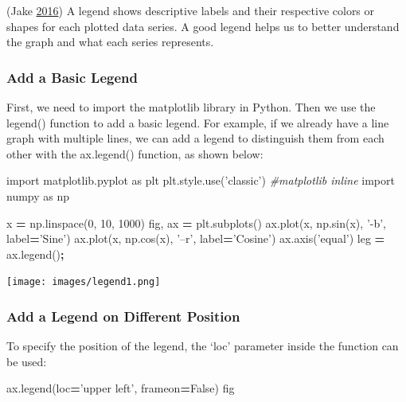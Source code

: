 \documentclass[]{book}
\newenvironment{Shaded}{\begin{snugshade}}{\end{snugshade}}
\newcommand{\CommentTok}[1]{\textcolor[rgb]{0.56,0.35,0.01}{\textit{#1}}}
\newcommand{\DecValTok}[1]{\textcolor[rgb]{0.00,0.00,0.81}{#1}}
\newcommand{\ImportTok}[1]{#1}
\newcommand{\NormalTok}[1]{#1}
\newcommand{\OperatorTok}[1]{\textcolor[rgb]{0.81,0.36,0.00}{\textbf{#1}}}
\newcommand{\StringTok}[1]{\textcolor[rgb]{0.31,0.60,0.02}{#1}}
\newcommand{\VariableTok}[1]{\textcolor[rgb]{0.00,0.00,0.00}{#1}}
\begin{document}
(Jake \protect\hyperlink{ref-PythonDataScienceHandbook}{2016})
A legend shows descriptive labels and their respective colors or shapes for each plotted data series. A good legend helps us to better understand the graph and what each series represents.

\hypertarget{add-a-basic-legend}{%
\subsubsection{Add a Basic Legend}\label{add-a-basic-legend}}

First, we need to import the matplotlib library in Python. Then we use the legend() function to add a basic legend. For example, if we already have a line graph with multiple lines, we can add a legend to distinguish them from each other with the ax.legend() function, as shown below:

\begin{Shaded}
\begin{Highlighting}[]
\ImportTok{import}\NormalTok{ matplotlib.pyplot }\ImportTok{as}\NormalTok{ plt}
\NormalTok{plt.style.use(}\StringTok{'classic'}\NormalTok{)}
\CommentTok{#matplotlib inline}
\ImportTok{import}\NormalTok{ numpy }\ImportTok{as}\NormalTok{ np}

\NormalTok{x }\OperatorTok{=}\NormalTok{ np.linspace(}\DecValTok{0}\NormalTok{, }\DecValTok{10}\NormalTok{, }\DecValTok{1000}\NormalTok{)}
\NormalTok{fig, ax }\OperatorTok{=}\NormalTok{ plt.subplots()}
\NormalTok{ax.plot(x, np.sin(x), }\StringTok{'-b'}\NormalTok{, label}\OperatorTok{=}\StringTok{'Sine'}\NormalTok{)}
\NormalTok{ax.plot(x, np.cos(x), }\StringTok{'--r'}\NormalTok{, label}\OperatorTok{=}\StringTok{'Cosine'}\NormalTok{)}
\NormalTok{ax.axis(}\StringTok{'equal'}\NormalTok{)}
\NormalTok{leg }\OperatorTok{=}\NormalTok{ ax.legend()}\OperatorTok{;}
\end{Highlighting}
\end{Shaded}

\texttt{[image: images/legend1.png]}

\hypertarget{add-a-legend-on-different-position}{%
\subsubsection{Add a Legend on Different Position}\label{add-a-legend-on-different-position}}

To specify the position of the legend, the `loc' parameter inside the function can be used:

\begin{Shaded}
\begin{Highlighting}[]
\NormalTok{ax.legend(loc}\OperatorTok{=}\StringTok{'upper left'}\NormalTok{, frameon}\OperatorTok{=}\VariableTok{False}\NormalTok{)}
\NormalTok{fig}
\end{Highlighting}
\end{Shaded}
\end{document}

